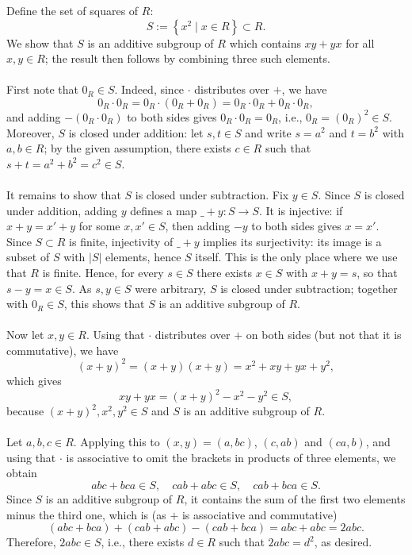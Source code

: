 \begin{solution}
    Define the set of squares of \( R \):
    \[
        S := \left\{ x^{2} \mid x \in R \right\} \subset R.
    \]
    We show that \( S \) is an additive subgroup of \( R \) which contains \( xy + yx \) for all \( x, y \in R \); the result then follows by combining three such elements.
    \\\\
    First note that \( 0_R \in S \). Indeed, since \( \cdot \) distributes over \( + \), we have
    \[
        0_R \cdot 0_R = 0_R \cdot \left(0_R + 0_R\right) = 0_R \cdot 0_R + 0_R \cdot 0_R,
    \]
    and adding \( -\left(0_R \cdot 0_R\right) \) to both sides gives \( 0_R \cdot 0_R = 0_R \), i.e., \( 0_R = \left(0_R\right)^{2} \in S \). Moreover, \( S \) is closed under addition: let \( s, t \in S \) and write \( s = a^{2} \) and \( t = b^{2} \) with \( a, b \in R \); by the given assumption, there exists \( c \in R \) such that \( s + t = a^{2} + b^{2} = c^{2} \in S \).
    \\\\
    It remains to show that \( S \) is closed under subtraction. Fix \( y \in S \). Since \( S \) is closed under addition, adding \( y \) defines a map \( \_ + y \colon S \rightarrow S \). It is injective: if \( x + y = x' + y \) for some \( x, x' \in S \), then adding \( -y \) to both sides gives \( x = x' \). Since \( S \subset R \) is finite, injectivity of \( \_ + y \) implies its surjectivity: its image is a subset of \( S \) with \( \left| S \right| \) elements, hence \( S \) itself. This is the only place where we use that \( R \) is finite. Hence, for every \( s \in S \) there exists \( x \in S \) with \( x + y = s \), so that \( s - y = x \in S \). As \( s, y \in S \) were arbitrary, \( S \) is closed under subtraction; together with \( 0_R \in S \), this shows that \( S \) is an additive subgroup of \( R \).
    \\\\
    Now let \( x, y \in R \). Using that \( \cdot \) distributes over \( + \) on both sides (but not that it is commutative), we have
    \[
        \left(x + y\right)^{2} = \left(x + y\right)\left(x + y\right) = x^{2} + xy + yx + y^{2},
    \]
    which gives
    \[
        xy + yx = \left(x + y\right)^{2} - x^{2} - y^{2} \in S,
    \]
    because \( \left(x + y\right)^{2}, x^{2}, y^{2} \in S \) and \( S \) is an additive subgroup of \( R \).
    \\\\
    Let \( a, b, c \in R \). Applying this to \( \left(x, y\right) = \left(a, bc\right) \), \( \left(c, ab\right) \) and \( \left(ca, b\right) \), and using that \( \cdot \) is associative to omit the brackets in products of three elements, we obtain
    \[
        abc + bca \in S, \quad cab + abc \in S, \quad cab + bca \in S.
    \]
    Since \( S \) is an additive subgroup of \( R \), it contains the sum of the first two elements minus the third one, which is (as \( + \) is associative and commutative)
    \[
        \left(abc + bca\right) + \left(cab + abc\right) - \left(cab + bca\right) = abc + abc = 2abc.
    \]
    Therefore, \( 2abc \in S \), i.e., there exists \( d \in R \) such that \( 2abc = d^{2} \), as desired.
\end{solution}
